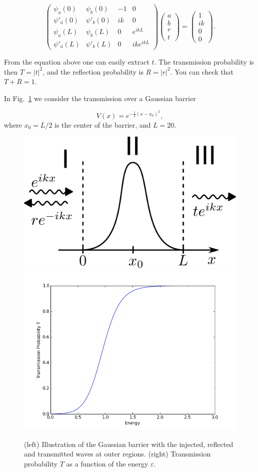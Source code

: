 \begin{equation}
 \begin{pmatrix}
  \psi_a(0) & \psi_b(0) & -1 & 0 \\
  \psi'_a(0) & \psi'_b(0) & ik & 0 \\
  \psi_a(L) & \psi_b(L) & 0 & e^{ikL}\\
  \psi'_a(L) & \psi'_b(L) & 0 & ike^{ikL}
 \end{pmatrix}
 \begin{pmatrix}
  a \\ b \\ r \\ t
 \end{pmatrix}
 =
 \begin{pmatrix}
  1 \\ ik \\ 0 \\ 0
 \end{pmatrix}.
 \label{eq:psimatch}
\end{equation}

From the equation above one can easily extract $t$. The transmission probability is then $T = |t|^2$, and the reflection probability is $R = |r|^2$. You can check that $T+R=1$.

In Fig.~\ref{fig:transmission} we consider the transmission over a Gaussian barrier

\begin{equation}
 V(x) = e^{-\frac{1}{2}(x-x_0)^2},
\end{equation}
where $x_0 = L/2$ is the center of the barrier, and $L = 20$.

\begin{figure}[ht!]
 \centering
 \includegraphics[width=0.45\columnwidth]{./transmissionbarrier.png}
 \includegraphics[width=0.45\columnwidth]{./transmission.png}
 \caption{(left) Illustration of the Gaussian barrier with the injected, reflected and transmitted waves at outer regions. (right) Transmission probability $T$ as a function of the energy $\varepsilon$.}
 \label{fig:transmission}
\end{figure}


